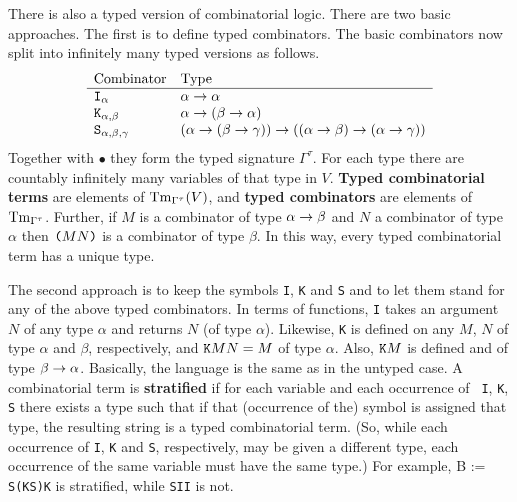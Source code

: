 There is also a typed version of combinatorial logic. There are
two basic approaches. The first is to define typed combinators.
The basic combinators now split into infinitely many typed
versions as follows.
\begin{equation}
$$\begin{array}{ll}
\mbox{\rm Combinator} & \mbox{\rm Type} \\\hline
\mbox{\tt I}_{\alpha} & \alpha \pf \alpha \\
\mbox{\tt K}_{\alpha,\beta} & \alpha \pf (\beta \pf \alpha) \\
\mbox{\tt S}_{\alpha,\beta,\gamma} &
    (\alpha \pf (\beta \pf \gamma)) \pf ((\alpha \pf \beta)
        \pf (\alpha \pf \gamma)) 
\end{array}
\end{equation}
Together with $\bullet$ they form the typed signature $\Gamma^\tau$.
For each type there are countably infinitely many variables
of that type in $V$.
\textbf{Typed combinatorial terms} are elements
of $\operatorname{Tm}_{\Gamma^{\tau}}(V)$, and \textbf{typed combinators}
are elements of $\operatorname{Tm}_{\Gamma^{\tau}}$. Further, if $M$
is a combinator of type $\alpha\rightarrow\beta$ and $N$ a combinator of
type $\alpha$  then $\mbox{\tt (}MN\mbox{\tt )}$ is a combinator
of type $\beta$. In this way, every typed combinatorial term has
a unique type.

The second approach is to keep the symbols {\tt I}, {\tt K} and
{\tt S} and to let them stand for any of the above typed
combinators. In terms of functions, {\tt I} takes an argument $N$
of any type $\alpha$ and returns $N$ (of type $\alpha$). Likewise,
{\tt K} is defined on any $M$, $N$ of type $\alpha$ and $\beta$,
respectively, and $\mbox{\tt K}MN = M$ of type $\alpha$. Also,
$\mbox{\tt K}M$ is defined and of type $\beta \rightarrow \alpha$. Basically,
the language is the same as in the untyped case. A combinatorial
term is
\textbf{stratified} if for each variable and each occurrence of {\tt
I}, {\tt K}, {\tt S} there exists a type such that if that
(occurrence of the) symbol is assigned that type, the resulting
string is a typed combinatorial term. (So, while each occurrence
of {\tt I}, {\tt K} and {\tt S}, respectively, may be given a
different type, each occurrence of the same variable must have the
same type.) For example, {\sf B} := {\tt S(KS)K} is stratified,
while {\tt SII} is not.

